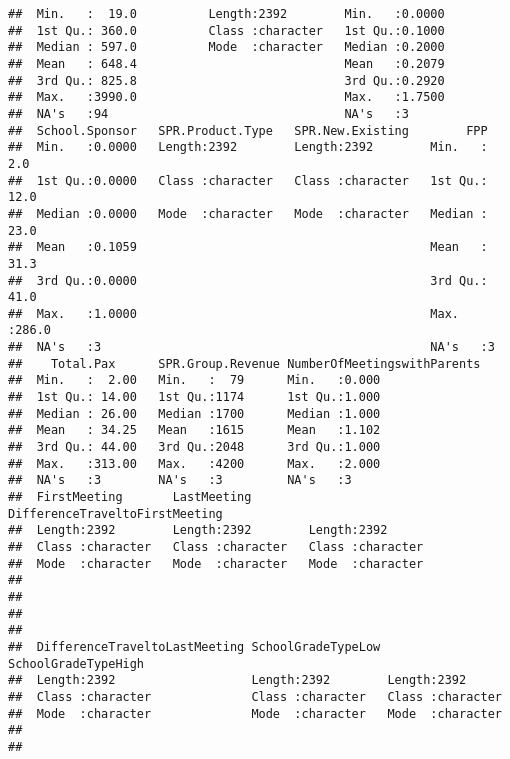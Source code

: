 \documentclass[
]{article}
\begin{document}
\begin{verbatim}
##  Min.   :  19.0          Length:2392        Min.   :0.0000     
##  1st Qu.: 360.0          Class :character   1st Qu.:0.1000     
##  Median : 597.0          Mode  :character   Median :0.2000     
##  Mean   : 648.4                             Mean   :0.2079     
##  3rd Qu.: 825.8                             3rd Qu.:0.2920     
##  Max.   :3990.0                             Max.   :1.7500     
##  NA's   :94                                 NA's   :3          
##  School.Sponsor   SPR.Product.Type   SPR.New.Existing        FPP       
##  Min.   :0.0000   Length:2392        Length:2392        Min.   :  2.0  
##  1st Qu.:0.0000   Class :character   Class :character   1st Qu.: 12.0  
##  Median :0.0000   Mode  :character   Mode  :character   Median : 23.0  
##  Mean   :0.1059                                         Mean   : 31.3  
##  3rd Qu.:0.0000                                         3rd Qu.: 41.0  
##  Max.   :1.0000                                         Max.   :286.0  
##  NA's   :3                                              NA's   :3      
##    Total.Pax      SPR.Group.Revenue NumberOfMeetingswithParents
##  Min.   :  2.00   Min.   :  79      Min.   :0.000              
##  1st Qu.: 14.00   1st Qu.:1174      1st Qu.:1.000              
##  Median : 26.00   Median :1700      Median :1.000              
##  Mean   : 34.25   Mean   :1615      Mean   :1.102              
##  3rd Qu.: 44.00   3rd Qu.:2048      3rd Qu.:1.000              
##  Max.   :313.00   Max.   :4200      Max.   :2.000              
##  NA's   :3        NA's   :3         NA's   :3                  
##  FirstMeeting       LastMeeting        DifferenceTraveltoFirstMeeting
##  Length:2392        Length:2392        Length:2392                   
##  Class :character   Class :character   Class :character              
##  Mode  :character   Mode  :character   Mode  :character              
##                                                                      
##                                                                      
##                                                                      
##                                                                      
##  DifferenceTraveltoLastMeeting SchoolGradeTypeLow SchoolGradeTypeHigh
##  Length:2392                   Length:2392        Length:2392        
##  Class :character              Class :character   Class :character   
##  Mode  :character              Mode  :character   Mode  :character   
##                                                                      
##                                                                      

\end{verbatim}
\end{document}

